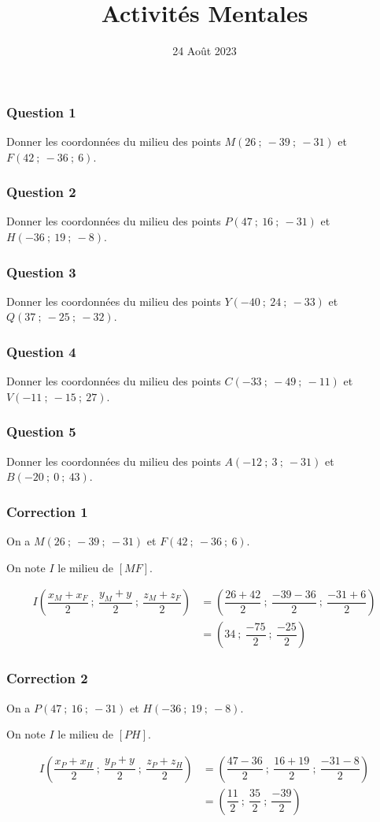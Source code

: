 \documentclass[15pt, mathserif]{beamer}
\title{Activités Mentales}
\date{24 Août 2023}
\begin{document}
\begin{frame}
    \titlepage
\end{frame}

\begin{frame} 
	\frametitle{Question 1}
Donner les coordonnées du milieu des points $M(26~;~-39~;~-31)$ et $F(42~;~-36~;~6)$.\end{frame}


\begin{frame} 
	\frametitle{Question 2}
Donner les coordonnées du milieu des points $P(47~;~16~;~-31)$ et $H(-36~;~19~;~-8)$.\end{frame}


\begin{frame} 
	\frametitle{Question 3}
Donner les coordonnées du milieu des points $Y(-40~;~24~;~-33)$ et $Q(37~;~-25~;~-32)$.\end{frame}


\begin{frame} 
	\frametitle{Question 4}
Donner les coordonnées du milieu des points $C(-33~;~-49~;~-11)$ et $V(-11~;~-15~;~27)$.\end{frame}


\begin{frame} 
	\frametitle{Question 5}
Donner les coordonnées du milieu des points $A(-12~;~3~;~-31)$ et $B(-20~;~0~;~43)$.\end{frame}


\begin{frame}
\vspace{-10mm}
	\frametitle{Correction 1}
On a $M(26~;~-39~;~-31)$ et $F(42~;~-36~;~6)$.

\medskip

On note $I$ le milieu de $[MF]$.

\begin{align*}
	I\left(\dfrac{x_{M}+x_{F}}{2}~;~\dfrac{y_{M}+y_{}}{2}~;~\dfrac{z_{M}+z_{F}}{2}\right)&= \left(\dfrac{26+42}{2}~;~\dfrac{-39-36}{2}~;~\dfrac{-31+6}{2}\right) \\
	&=\left(34~;~\dfrac{-75}{2}~;~\dfrac{-25}{2}\right)
\end{align*}\end{frame}


\begin{frame}
\vspace{-10mm}
	\frametitle{Correction 2}
On a $P(47~;~16~;~-31)$ et $H(-36~;~19~;~-8)$.

\medskip

On note $I$ le milieu de $[PH]$.

\begin{align*}
	I\left(\dfrac{x_{P}+x_{H}}{2}~;~\dfrac{y_{P}+y_{}}{2}~;~\dfrac{z_{P}+z_{H}}{2}\right)&= \left(\dfrac{47-36}{2}~;~\dfrac{16+19}{2}~;~\dfrac{-31-8}{2}\right) \\
	&=\left(\dfrac{11}{2}~;~\dfrac{35}{2}~;~\dfrac{-39}{2}\right)
\end{align*}\end{frame}
\end{document}
